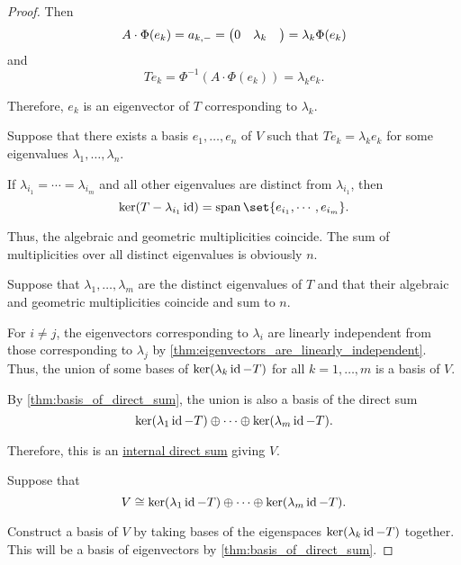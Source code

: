 \begin{proof}
  Then
  \begin{equation*}
    A \cdot \Phi(e_k) = a_{k,\anon*} = \begin{pmatrix} 0 & \lambda_k & \end{pmatrix} = \lambda_k \Phi(e_k)
  \end{equation*}
  and
  \begin{equation*}
    T e_k = \Phi^{-1}(A \cdot \Phi(e_k)) = \lambda_k e_k.
  \end{equation*}

  Therefore, \( e_k \) is an eigenvector of \( T \) corresponding to \( \lambda_k \).

   Suppose that there exists a basis \( e_1, \ldots, e_n \) of \( V \) such that \( Te_k = \lambda_k e_k \) for some eigenvalues \( \lambda_1, \ldots, \lambda_n \).

  If \( \lambda_{i_1} = \cdots = \lambda_{i_m} \) and all other eigenvalues are distinct from \( \lambda_{i_1} \), then
  \begin{equation*}
    \ker(T - \lambda_{i_1} \id) = \linspan\set{ e_{i_1}, \cdots, e_{i_m} }.
  \end{equation*}

  Thus, the algebraic and geometric multiplicities coincide. The sum of multiplicities over all distinct eigenvalues is obviously \( n \).

   Suppose that \( \lambda_1, \ldots, \lambda_m \) are the distinct eigenvalues of \( T \) and that their algebraic and geometric multiplicities coincide and sum to \( n \).

  For \( i \neq j \), the eigenvectors corresponding to \( \lambda_i \) are linearly independent from those corresponding to \( \lambda_j \) by \cref{thm:eigenvectors_are_linearly_independent}. Thus, the union of some bases of \( \ker(\lambda_k \operatorname{id} - T) \) for all \( k = 1, \ldots, m \) is a basis of \( V \).

  By \cref{thm:basis_of_direct_sum}, the union is also a basis of the direct sum
  \begin{equation*}
    \ker(\lambda_1 \operatorname{id} - T) \oplus \cdots \oplus \ker(\lambda_m \operatorname{id} - T).
  \end{equation*}

  Therefore, this is an \hyperref[def:semimodule_direct_sum]{internal direct sum} giving \( V \).

   Suppose that
  \begin{equation*}
    V \cong \ker(\lambda_1 \operatorname{id} - T) \oplus \cdots \oplus \ker(\lambda_m \operatorname{id} - T).
  \end{equation*}

  Construct a basis of \( V \) by taking bases of the eigenspaces \( \ker(\lambda_k \operatorname{id} - T) \) together. This will be a basis of eigenvectors by \cref{thm:basis_of_direct_sum}.
\end{proof}

